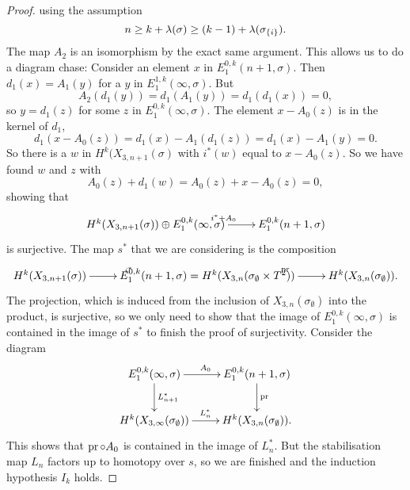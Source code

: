 \begin{proof}
using the assumption 
\[ n \geq k+\lambda(\sigma) \geq
(k-1)+\lambda(\sigma_{\left\{ i \right\}}). \]
The map $A_2$ is an isomorphism by the exact same argument.
This allows us to do a diagram chase: Consider an element $x$ in
$E_1^{0,k}(n+1,\sigma)$. Then $d_1(x) = A_1(y)$ for a $y$ in
$E_1^{1,k}(\infty,\sigma)$. But 
\[ A_2(d_1(y)) = d_1(A_1(y)) = d_1(d_1(x)) = 0, \]
so $y = d_1(z)$ for some $z$ in $E_1^{0,k}(\infty,\sigma)$. The
element $x - A_0(z)$ is in the kernel of $d_1$,
\[ d_1(x - A_0(z)) = d_1(x) - A_1(d_1(z)) = d_1(x) - A_1(y) = 0. \]
So there is a $w$ in $H^k(X_{3,n+1}(\sigma)$ with $i^*(w)$ equal to
$x-A_0(z)$. So we have found $w$ and $z$ with
\[ A_0(z) + d_1(w) = A_0(z) + x - A_0(z) = 0, \]
showing that
\[ \xymatrix{ H^k(X_{3,n+1}(\sigma)) \oplus E_1^{0,k}(\infty,\sigma)
  \ar[r]^{i^* + A_0} & E_1^{0,k}(n+1,\sigma) } \]  
is surjective. The map $s^*$ that we are considering is the
composition
\[ \xymatrix{ H^k(X_{3,n+1}(\sigma)) \ar[r]^{i^*} &
  E_1^{0,k}(n+1,\sigma) = H^k(X_{3,n}(\sigma_{\emptyset}\times T^2))
  \ar[r]^{\pr} & H^k(X_{3,n}(\sigma_{\emptyset})). } \]
The projection, which is induced from the inclusion of
$X_{3,n}(\sigma_{\emptyset})$ into the product, is surjective, so we
only need to show that the image of
$E_1^{0,k}(\infty,\sigma)$ is contained in the image of $s^*$ to
finish the proof of surjectivity. Consider the diagram
\[ \xymatrix{ E_1^{0,k}(\infty,\sigma) \ar[r]^{A_0} \ar[d]^{L_{n+1}^*}
  & E_1^{0,k}(n+1,\sigma) \ar[d]^{\pr} \\
  H^k(X_{3,\infty}(\sigma_{\emptyset})) \ar[r]^{L_n^*} &
  H^k(X_{3,n}(\sigma_{\emptyset})). } \] 
This shows that $\operatorname{pr}\circ A_0$ is contained in the image of
$L_n^*$. But the stabilisation map $L_n$ factors up to homotopy over
$s$, so we are finished and the induction hypothesis $I_k$ holds.
\end{proof}



